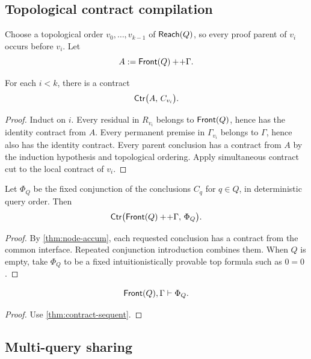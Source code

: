 \subsection{Topological contract compilation}

Choose a topological order \(v_0,\ldots,v_{k-1}\) of \(\mathsf{Reach}(Q)\), so every proof parent of \(v_i\) occurs before \(v_i\).  Let
\[
        A\mathrel{:=}\mathsf{Front}(Q)+\!+\Gamma.
\]

\begin{theorem}\label{thm:node-accum}
For each \(i<k\), there is a contract
\[
     \mathsf{Ctr}\bigl(A,\,C_{v_i}\bigr).
\]
\end{theorem}

\begin{proof}
Induct on \(i\).  Every residual in \(R_{v_i}\) belongs to \(\mathsf{Front}(Q)\), hence has the identity contract from \(A\).  Every permanent premise in \(\Gamma_{v_i}\) belongs to \(\Gamma\), hence also has the identity contract.  Every parent conclusion has a contract from \(A\) by the induction hypothesis and topological ordering.  Apply simultaneous contract cut to the local contract of \(v_i\).
\end{proof}

\begin{theorem}\label{thm:query-compile}
Let \(\Phi_Q\) be the fixed conjunction of the conclusions \(C_q\) for \(q\in Q\), in deterministic query order.  Then
\[
                \mathsf{Ctr}\bigl(\mathsf{Front}(Q)+\!+\Gamma,\,\Phi_Q\bigr).
\]
\end{theorem}

\begin{proof}
By \cref{thm:node-accum}, each requested conclusion has a contract from the common interface.  Repeated conjunction introduction combines them.  When \(Q\) is empty, take \(\Phi_Q\) to be a fixed intuitionistically provable top formula such as \(0=0\).
\end{proof}

\begin{corollary}
\[
             \mathsf{Front}(Q),\Gamma\vdash\Phi_Q.
\]
\end{corollary}

\begin{proof}
Use \cref{thm:contract-sequent}.
\end{proof}

\subsection{Multi-query sharing}

